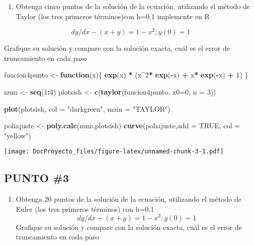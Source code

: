 \documentclass[]{article}
\newenvironment{Shaded}{\begin{snugshade}}{\end{snugshade}}
\newcommand{\KeywordTok}[1]{\textcolor[rgb]{0.13,0.29,0.53}{\textbf{#1}}}
\newcommand{\DataTypeTok}[1]{\textcolor[rgb]{0.13,0.29,0.53}{#1}}
\newcommand{\DecValTok}[1]{\textcolor[rgb]{0.00,0.00,0.81}{#1}}
\newcommand{\StringTok}[1]{\textcolor[rgb]{0.31,0.60,0.02}{#1}}
\newcommand{\OtherTok}[1]{\textcolor[rgb]{0.56,0.35,0.01}{#1}}
\newcommand{\ControlFlowTok}[1]{\textcolor[rgb]{0.13,0.29,0.53}{\textbf{#1}}}
\newcommand{\OperatorTok}[1]{\textcolor[rgb]{0.81,0.36,0.00}{\textbf{#1}}}
\newcommand{\NormalTok}[1]{#1}
\providecommand{\tightlist}{%
  \setlength{\itemsep}{0pt}\setlength{\parskip}{0pt}}
\begin{document}
\begin{enumerate}
\def\labelenumi{\arabic{enumi}.}
\setcounter{enumi}{1}
\tightlist
\item
  Obtenga cinco puntos de la solución de la ecuación, utilizando el
  método de Taylor (los tres primeros términos)con h=0.1 implemente en R
\end{enumerate}

\[
    dy/dx - (x+y) = 1 - x^2; y(0) =1 
\]

Grafique su solución y compare con la solución exacta, cuál es el error
de truncamiento en cada paso

\begin{Shaded}
\begin{Highlighting}[]
\NormalTok{funcion4punto <-}\StringTok{ }\ControlFlowTok{function}\NormalTok{(x)\{}
  \KeywordTok{exp}\NormalTok{(x) }\OperatorTok{*}\StringTok{ }\NormalTok{(x}\OperatorTok{^}\DecValTok{2}\OperatorTok{*}\StringTok{ }\KeywordTok{exp}\NormalTok{(}\OperatorTok{-}\NormalTok{x) }\OperatorTok{+}\StringTok{ }\NormalTok{x}\OperatorTok{*}\StringTok{ }\KeywordTok{exp}\NormalTok{(}\OperatorTok{-}\NormalTok{x) }\OperatorTok{+}\StringTok{ }\DecValTok{1}\NormalTok{)}
\NormalTok{\}}

\NormalTok{num <-}\StringTok{ }\KeywordTok{seq}\NormalTok{(}\DecValTok{1}\OperatorTok{:}\DecValTok{4}\NormalTok{)}
\NormalTok{plotsish <-}\StringTok{ }\KeywordTok{c}\NormalTok{(}\KeywordTok{taylor}\NormalTok{(funcion4punto, }\DataTypeTok{x0=}\DecValTok{0}\NormalTok{, }\DataTypeTok{n =} \DecValTok{3}\NormalTok{))}

\KeywordTok{plot}\NormalTok{(plotsish, }\DataTypeTok{col =} \StringTok{"darkgreen"}\NormalTok{, }\DataTypeTok{main =} \StringTok{"TAYLOR"}\NormalTok{)}

\NormalTok{poliajuste <-}\StringTok{ }\KeywordTok{poly.calc}\NormalTok{(num,plotsish)}
\KeywordTok{curve}\NormalTok{(poliajuste,}\DataTypeTok{add =} \OtherTok{TRUE}\NormalTok{, }\DataTypeTok{col =} \StringTok{"yellow"}\NormalTok{)}
\end{Highlighting}
\end{Shaded}

\texttt{[image: DocProyecto\_files/figure-latex/unnamed-chunk-3-1.pdf]}

\subsection{PUNTO \#3}\label{punto-3}

\begin{enumerate}
\def\labelenumi{\arabic{enumi}.}
\setcounter{enumi}{2}
\tightlist
\item
  Obtenga 20 puntos de la solución de la ecuación, utilizando el método
  de Euler (los tres primeros términos) con h=0.1 \[
  dy/dx - (x+y) = 1 - x^2; y(0) =1 
  \] Grafique su solución y compare con la solución exacta, cuál es el
  error de truncamiento en cada paso
\end{enumerate}
\end{document}
